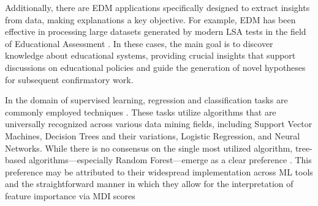 Additionally, there are \gls{EDM} applications specifically designed to extract insights from data, making explanations a key objective. For example, \gls{EDM} has been effective in processing large datasets generated by modern \gls{LSA} tests in the field of Educational Assessment \cite{Liu2008UsingEnergy, CardosoSilvaFilho2023BeyondEffectiveness, SilvaFilho2023LeveragingEducation, Saarela2016PredictingApproach}. In these cases, the main goal is to discover knowledge about educational systems, providing crucial insights that support discussions on educational policies and guide the generation of novel hypotheses for subsequent confirmatory work.

In the domain of supervised learning, regression and classification tasks are commonly employed techniques \cite{Aldowah2019EducationalSynthesis}. These tasks utilize algorithms that are universally recognized across various data mining fields, including Support Vector Machines, Decision Trees and their variations, Logistic Regression, and Neural Networks. While there is no consensus on the single most utilized algorithm, tree-based algorithms—especially Random Forest—emerge as a clear preference \cite{Rastrollo-Guerrero2020AnalyzingReview, Khan2021StudentStudies, Martinez-Abad2020EducationalAssessment, Namoun2020PredictingReview}. This preference may be attributed to their widespread implementation across \gls{ML} tools and the straightforward manner in which they allow for the interpretation of feature importance via \gls{MDI} scores





